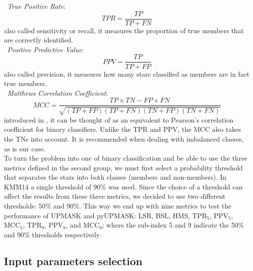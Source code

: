 \documentclass{aa}
\begin{document}
 \noindent \textbullet\ \emph{True Positive Rate}:
 \begin{equation}
 TPR = \frac{TP}{TP+FN}
 \end{equation}
 \noindent also called sensitivity or recall, it measures the proportion of
 true members that are correctly identified.\\

 \noindent \textbullet\ \emph{Positive Predictive Value}:
 \begin{equation}
 PPV = \frac{TP}{TP+FP}
 \end{equation}
 \noindent also called precision, it measures how many stars classified as
 members are in fact true members.\\

 \noindent \textbullet\ \emph{Matthews Correlation Coefficient}:
 \begin{equation}
 MCC = \frac{TP \times TN - FP \times FN}{\sqrt{(TP + FP)(TP + FN)(TN + FP)(TN + FN)}}
 \end{equation}
 \noindent introduced in \cite{Matthews_1975}, it can be thought of as an
 equivalent to Pearson's correlation coefficient for binary classifiers. Unlike
 the TPR and PPV, the MCC also takes the TNs into account. It is
 recommended when dealing with imbalanced classes, as is our case.\\

 \noindent To turn the problem into one of binary classification and be able
 to use the three metrics defined in the second group, we must first select a
 probability threshold that separates the stars into both classes (members and
 non-members). In KMM14 a single threshold of 90\% was used. Since the choice
 of a threshold can affect the results from these three metrics, we decided
 to use two different thresholds: 50\% and 90\%. This way we end up with nine
 metrics to test the performance of UPMASK and pyUPMASK: LSR, BSL, HMS, TPR$_5$,
 PPV$_5$, MCC$_5$, TPR$_9$, PPV$_9$, and MCC$_9$; where the sub-index 5 and 9
 indicate the 50\% and 90\% thresholds respectively.



\subsection{Input parameters selection}
 \label{ssec:input_pars}
\end{document}
